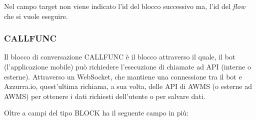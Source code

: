 
Nel campo target non viene indicato l'id del blocco successivo ma, l'id del \emph{flow} che si vuole eseguire.

\subsubsection{CALLFUNC}

Il blocco di conversazione CALLFUNC è il blocco attraverso il quale, il bot (l'applicazione mobile) può richiedere l’esecuzione di chiamate ad API (interne o esterne). Attraverso un WebSocket, che mantiene una connessione tra il bot e Azzurra.io, quest’ultima richiama, a sua volta, delle API di AWMS (o esterne ad AWMS) per ottenere i dati richiesti dell’utente o per salvare dati. 


Oltre a campi del tipo BLOCK ha il seguente campo in più:

